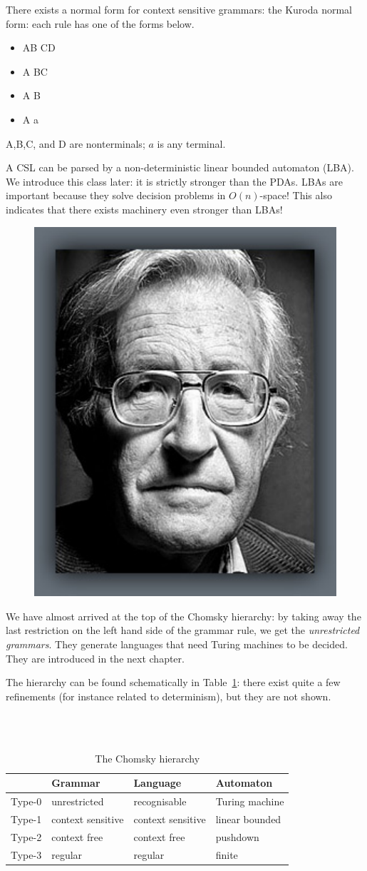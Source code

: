 \clearpage

There exists a normal form for context sensitive grammars: the Kuroda
normal form: each rule has one of the forms below.

\begin{itemize}
\item[] AB \rpijl CD
\item[] A \rpijl BC
\item[] A \rpijl B
\item[] A \rpijl a
\end{itemize}

A,B,C, and D are nonterminals; $a$ is any terminal.


A CSL can be parsed by a non-deterministic linear bounded automaton
(LBA). We introduce this class later: it is strictly stronger than the
PDAs. LBAs are important because they solve decision problems in
$O(n)$-space! This also indicates that there exists machinery even
stronger than LBAs!


\begin{figure}
\includegraphics[width=.2\textwidth,keepaspectratio]{afbeeldingen/chomsky}
\end{figure}
We have almost arrived at the top of the Chomsky hierarchy: by taking
away the last restriction on the left hand side of the grammar rule,
we get the {\em unrestricted grammars}. They generate languages that
need Turing machines to be decided. They are introduced in the next
chapter.

The hierarchy can be found schematically in Table~\ref{chomskyhier}:
there exist quite a few refinements (for instance related to
determinism), but they are not shown.

~\\
~\\
\begin{table}[ht]
\center
\begin{tabular}{|l|l|l|l|}
\hline
         & Grammar          & Language              & Automaton \\ \hline
Type-0   & unrestricted        & recognisable      & Turing machine \\
Type-1   & context sensitive   & context sensitive & linear bounded   \\
Type-2   & context free        & context free      & pushdown \\
Type-3   & regular            & regular          & finite  \\
\hline
\end{tabular}
\caption{The Chomsky hierarchy} \label{chomskyhier}
\end{table}


